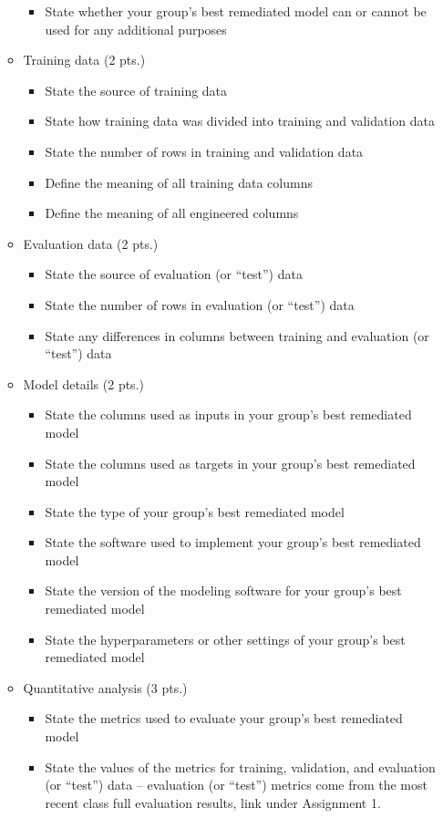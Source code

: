 \documentclass[fleqn]{article}
\begin{document}
\begin{itemize}
\begin{itemize}
\begin{itemize}
			\item State whether your group's best remediated model can or cannot be used for any additional purposes
		\end{itemize}
		\item Training data (2 pts.)
		\begin{itemize}
			\item State the source of training data
			\item State how training data was divided into training and validation data 
			\item State the number of rows in training and validation data
			\item Define the meaning of all training data columns
			\item Define the meaning of all engineered columns 
		\end{itemize}
		\item Evaluation data (2 pts.)
		\begin{itemize}
			\item State the source of evaluation (or “test”) data
			\item State the number of rows in evaluation (or “test”) data
			\item State any differences in columns between training and evaluation (or “test”) data
		\end{itemize}
		\item Model details (2 pts.)
		\begin{itemize}
			\item State the columns used as inputs in your group's best remediated model
			\item State the columns used as targets in your group's best remediated model
			\item State the type of your group's best remediated model
			\item State the software used to implement your group's best remediated model
			\item State the version of the modeling software for your group's best remediated model
			\item State the hyperparameters or other settings of your group's best remediated model
		\end{itemize}
		\item Quantitative analysis (3 pts.)
		\begin{itemize} 
			\item State the metrics used to evaluate your group's best remediated model
			\item State the values of the metrics for training, validation, and evaluation (or “test”) data -- evaluation (or “test”) metrics come from the most recent class full evaluation results, link under Assignment 1.

\end{itemize}
\end{itemize}
\end{itemize}
\end{document}
